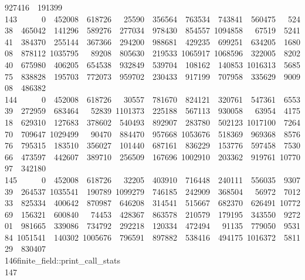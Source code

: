 \begin{tabbing}
927416\ \ 191399\\[0pt]
143\>\ \ \ \ \ \ 0\ \ 452008\ \ 618726\ \ \ 25590\ \ 356564\ \ 763534\ \ 743841\ \ 560475\ \ \ 52438\ \ 465042\ \ 141296\ \ 589276\ \ 277034\ \ 978430\ \ 854557\ 1094858\ \ \ 67519\ \ 524141\ \ 384370\ \ 255144\ \ 367366\ \ 294200\ \ 988681\ \ 429235\ \ 699251\ \ 634205\ \ 168008\ \ 878112\ 1035795\ \ \ 89208\ \ 805630\ \ 219533\ 1065917\ 1068596\ \ 322005\ \ 820240\ \ 675980\ \ 406205\ \ 654538\ \ 932849\ \ 539704\ \ 108162\ \ 140853\ 1016313\ \ 568575\ \ 838828\ \ 195703\ \ 772073\ \ 959702\ \ 230433\ \ 917199\ \ 707958\ \ 335629\ 
\ 900908\ \ 486382\\[0pt]
144\>\ \ \ \ \ \ 0\ \ 452008\ \ 618726\ \ \ 30557\ \ 781670\ \ 824121\ \ 320761\ \ 547361\ \ 655339\ \ 272959\ \ 683464\ \ \ 52839\ 1101373\ \ 225188\ \ 567113\ \ 930058\ \ \ 63954\ \ 417518\ \ 629310\ \ 127683\ \ 378602\ \ 540493\ \ 892907\ \ 283780\ \ 502123\ 1017100\ \ 726470\ \ 709647\ 1029499\ \ \ 90470\ \ 884470\ \ 957668\ 1053676\ \ 518369\ \ 969368\ \ 857676\ \ 795315\ \ 183510\ \ 356027\ \ 101440\ \ 687161\ \ 836229\ \ 153776\ \ 597458\ \ 753066\ \ 473597\ \ 442607\ \ 389710\ \ 256509\ \ 167696\ 1002910\ \ 203362\ \ 919761\ 
1077097\ \ 342180\\[0pt]
145\>\ \ \ \ \ \ 0\ \ 452008\ \ 618726\ \ \ 32205\ \ 403910\ \ 716448\ \ 240111\ \ 556035\ \ 930739\ \ 264537\ 1035541\ \ 190789\ 1099279\ \ 746185\ \ 242909\ \ 368504\ \ \ 56972\ \ 701233\ \ 825334\ \ 400642\ \ 870987\ \ 646208\ \ 314541\ \ 515667\ \ 682370\ \ 626491\ 1077269\ \ 156321\ \ 600840\ \ \ 74453\ \ 428367\ \ 863578\ \ 210579\ \ 179195\ \ 343550\ \ 927201\ \ 981665\ \ 339086\ \ 734792\ \ 292218\ \ 120334\ \ 472494\ \ \ 91135\ \ 779050\ \ 953184\ 1051541\ \ 140302\ 1005676\ \ 796591\ \ 897882\ \ 538416\ \ 494175\ 1016372\ \ 
581129\ \ 830407\\[0pt]
146\>\symbol{35}finite\_field::print\_call\_stats\\[0pt]
147\>\end{tabbing}
